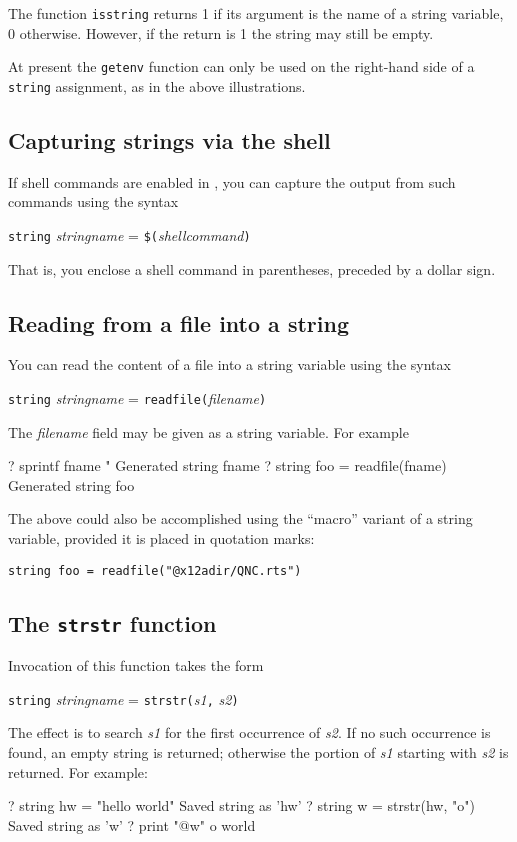 The function \texttt{isstring} returns 1 if its argument is the name
of a string variable, 0 otherwise.  However, if the return is 1
the string may still be empty.

At present the \texttt{getenv} function can only be used on the
right-hand side of a \texttt{string} assignment, as in the above
illustrations.

\subsection{Capturing strings via the shell}

If shell commands are enabled in , you can capture the
output from such commands using the syntax 

\texttt{string} \textsl{stringname} = \texttt{\$(}\textsl{shellcommand}\texttt{)}

That is, you enclose a shell command in parentheses, preceded by
a dollar sign.

\subsection{Reading from a file into a string}

You can read the content of a file into a string variable using
the syntax

\texttt{string} \textsl{stringname} = \texttt{readfile(}\textsl{filename}\texttt{)}

The \textsl{filename} field may be given as a string variable.  For
example
%
\begin{code}
? sprintf fname "%
Generated string fname
? string foo = readfile(fname)
Generated string foo
\end{code}
%
The above could also be accomplished using the ``macro'' variant
of a string variable, provided it is placed in quotation marks: 

\verb|string foo = readfile("@x12adir/QNC.rts")|

\subsection{The \texttt{strstr} function}

Invocation of this function takes the form

\texttt{string} \textsl{stringname} = 
\texttt{strstr(}\textsl{s1}\texttt{,} \textsl{s2}\texttt{)}

The effect is to search \textsl{s1} for the first occurrence of
\textsl{s2}.  If no such occurrence is found, an empty string is
returned; otherwise the portion of \textsl{s1} starting with
\textsl{s2} is returned.  For example:
%
\begin{code}
? string hw = "hello world"
Saved string as 'hw'
? string w = strstr(hw, "o")
Saved string as 'w'
? print "@w"
o world
\end{code}
%


    

